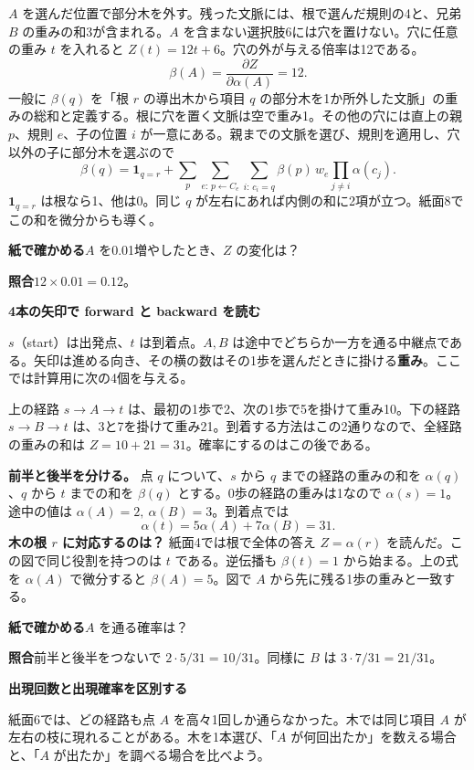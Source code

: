 \documentclass[a5paper,10pt]{ltjsarticle}
\newcommand{\unit}[2]{\clearpage{\small 動画①　#1}\par{\Large\bfseries #2}\par\medskip}
\newcommand{\task}[1]{\par\medskip\textbf{紙で確かめる}\quad #1}
\newcommand{\ans}[1]{\par\textbf{照合}\quad #1}
\begin{document}
$A$ を選んだ位置で部分木を外す。残った文脈には、根で選んだ規則の4と、兄弟 $B$ の重みの和3が含まれる。$A$ を含まない選択肢6には穴を置けない。穴に任意の重み $t$ を入れると $Z(t)=12t+6$。穴の外が与える倍率は12である。
\[
\beta(A)=\frac{\partial Z}{\partial\alpha(A)}=12.
\]
一般に $\beta(q)$ を「根 $r$ の導出木から項目 $q$ の部分木を1か所外した文脈」の重みの総和と定義する。根に穴を置く文脈は空で重み1。その他の穴には直上の親 $p$、規則 $e$、子の位置 $i$ が一意にある。親までの文脈を選び、規則を適用し、穴以外の子に部分木を選ぶので
\[
\beta(q)=\mathbf{1}_{q=r}+\sum_p\sum_{e:\,p\leftarrow C_e}
\sum_{i:\,c_i=q}\beta(p)\,w_e\prod_{j\ne i}\alpha(c_j).
\]
$\mathbf{1}_{q=r}$ は根なら1、他は0。同じ $q$ が左右にあれば内側の和に2項が立つ。紙面8でこの和を微分からも導く。
\task{$A$ を0.01増やしたとき、$Z$ の変化は？}\ans{$12\times0.01=0.12$。}
\unit{16:34}{4本の矢印で forward と backward を読む}
$s$（start）は出発点、$t$ は到着点。$A,B$ は途中でどちらか一方を通る中継点である。矢印は進める向き、その横の数はその1歩を選んだときに掛ける\textbf{重み}。ここでは計算用に次の4個を与える。
\begin{center}\end{center}
上の経路 $s\to A\to t$ は、最初の1歩で2、次の1歩で5を掛けて重み10。下の経路 $s\to B\to t$ は、3と7を掛けて重み21。到着する方法はこの2通りなので、全経路の重みの和は $Z=10+21=31$。確率にするのはこの後である。

\textbf{前半と後半を分ける。} 点 $q$ について、$s$ から $q$ までの経路の重みの和を $\alpha(q)$、$q$ から $t$ までの和を $\beta(q)$ とする。0歩の経路の重みは1なので $\alpha(s)=1$。途中の値は $\alpha(A)=2,\ \alpha(B)=3$。到着点では
\[
\alpha(t)=5\alpha(A)+7\alpha(B)=31.
\]
\textbf{木の根 $r$ に対応するのは？} 紙面4では根で全体の答え $Z=\alpha(r)$ を読んだ。この図で同じ役割を持つのは $t$ である。逆伝播も $\beta(t)=1$ から始まる。上の式を $\alpha(A)$ で微分すると $\beta(A)=5$。図で $A$ から先に残る1歩の重みと一致する。
\task{$A$ を通る確率は？}\ans{前半と後半をつないで $2\cdot5/31=10/31$。同様に $B$ は $3\cdot7/31=21/31$。}
\unit{20:29／24:33}{出現回数と出現確率を区別する}
紙面6では、どの経路も点 $A$ を高々1回しか通らなかった。木では同じ項目 $A$ が左右の枝に現れることがある。木を1本選び、「$A$ が何回出たか」を数える場合と、「$A$ が出たか」を調べる場合を比べよう。
\end{document}
